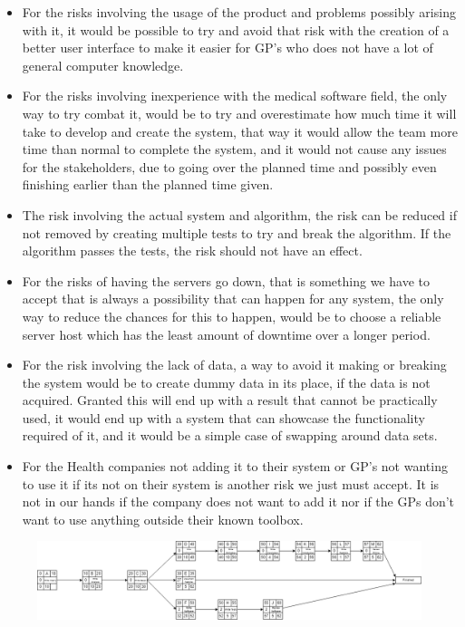 \begin{itemize}
	\item For the risks involving the usage of the product and problems possibly arising with it, it would be possible to try and avoid that risk with the creation of a better user interface to make it easier for GP’s who does not have a lot of general computer knowledge. 
	\item For the risks involving inexperience with the medical software field, the only way to try combat it, would be to try and overestimate how much time it will take to develop and create the system, that way it would allow the team more time than normal to complete the system, and it would not cause any issues for the stakeholders, due to going over the planned time and possibly even finishing earlier than the planned time given.
	\item The risk involving the actual system and algorithm, the risk can be reduced if not removed by creating multiple tests to try and break the algorithm. If the algorithm passes the tests, the risk should not have an effect.
	\item For the risks of having the servers go down, that is something we have to accept that is always a possibility that can happen for any system, the only way to reduce the chances for this to happen, would be to choose a reliable server host which has the least amount of downtime over a longer period.
	\item For the risk involving the lack of data, a way to avoid it making or breaking the system would be to create dummy data in its place, if the data is not acquired. Granted this will end up with a result that cannot be practically used, it would end up with a system that can showcase the functionality required of it, and it would be a simple case of swapping around data sets.
	\item For the Health companies not adding it to their system or GP’s not wanting to use it if its not on their system is another risk we just must accept. It is not in our hands if the company does not want to add it nor if the GPs don’t want to use anything outside their known toolbox.
\end{itemize}


\pagebreak
\begin{figure}
	\includegraphics[width=40em,keepaspectratio]{Network Diagram.png}
\end{figure}

